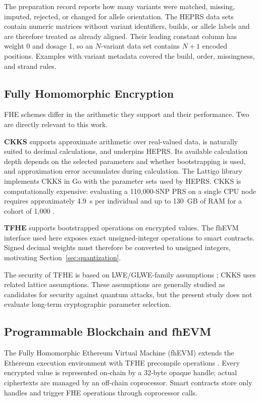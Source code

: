 \documentclass[10pt]{article}
\begin{document}
The preparation record reports how many variants were matched, missing, imputed,
rejected, or changed for allele orientation.  The HEPRS data sets contain
numeric matrices without variant identifiers, builds, or allele labels and are therefore
treated as already aligned.  Their leading constant column has weight 0 and dosage 1,
so an $N$-variant data set contains $N+1$ encoded positions.  Examples with variant
metadata covered the build, order, missingness, and strand rules.

\subsection{Fully Homomorphic Encryption}

FHE schemes differ in the arithmetic they support and their performance.  Two are
directly relevant to this work.

\textbf{CKKS} \citep{cheon2017ckks} supports approximate arithmetic over real-valued data, is
naturally suited to decimal calculations, and underpins HEPRS.  Its available
calculation depth depends on the selected parameters and whether bootstrapping is used,
and approximation error accumulates during calculation.  The Lattigo library
\citep{lattigo} implements CKKS in Go with the parameter sets used
by HEPRS.  CKKS is computationally expensive: evaluating a 110,000-SNP PRS on a
single CPU node requires approximately 4.9~s per individual and up to 130~GB of RAM
for a cohort of 1,000 \citep{knight2026heprs}.

\textbf{TFHE} \citep{chillotti2020tfhe} supports bootstrapped operations on encrypted
values.  The fhEVM interface used here exposes exact unsigned-integer operations to
smart contracts.  Signed decimal weights must therefore be converted to unsigned
integers, motivating Section~\ref{sec:quantization}.

The security of TFHE is based on LWE/GLWE-family assumptions
\citep{chillotti2020tfhe}; CKKS uses related lattice assumptions.  These assumptions
are generally studied as candidates for security against quantum attacks, but the
present study does not evaluate long-term cryptographic parameter selection.

\subsection{Programmable Blockchain and fhEVM}

The Fully Homomorphic Ethereum Virtual Machine (fhEVM) extends the Ethereum
execution environment with TFHE precompile operations \citep{zamafhevm}.  Every
encrypted value is represented on-chain by a 32-byte opaque handle; actual
ciphertexts are managed by an off-chain coprocessor.  Smart contracts store only
handles and trigger FHE operations through coprocessor calls.
\end{document}

